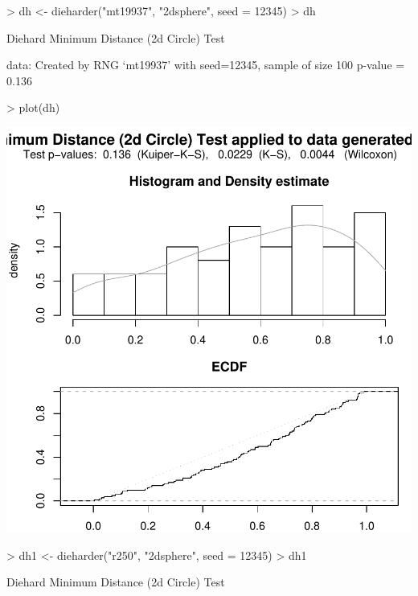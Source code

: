 \documentclass[12pt]{article}
\begin{document}
\begin{center}
\begin{footnotesize}
%
\begin{Schunk}
\begin{Sinput}
> dh <- dieharder("mt19937", "2dsphere", seed = 12345)
> dh
\end{Sinput}
\begin{Soutput}
	Diehard Minimum Distance (2d Circle) Test

data:  Created by RNG `mt19937' with seed=12345, sample of size 100 
p-value = 0.136
\end{Soutput}
\begin{Sinput}
> plot(dh)
\end{Sinput}
\end{Schunk}
\includegraphics{RDieHarder-rd-example}
\begin{Schunk}
\begin{Sinput}
> dh1 <- dieharder("r250", "2dsphere", seed = 12345)
> dh1
\end{Sinput}
\begin{Soutput}
	Diehard Minimum Distance (2d Circle) Test


\end{Soutput}
\end{Schunk}
\end{footnotesize}
\end{center}
\end{document}
